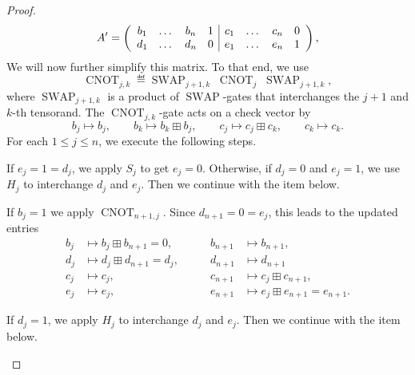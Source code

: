 \documentclass[a4paper, oneside, 12pt]{amsart}
\DeclareMathOperator{\SWAP}{SWAP}
\DeclareMathOperator{\CNOT}{CNOT}
\begin{document}
\begin{proof}
  \begin{equation*}
    A'=\left(
      \begin{array}{c c c c| c c c c}
        b_{1} & \dots & b_{n} & 1 & c_{1} & \dots & c_{n} & 0 \\
        d_{1} & \dots & d_{n} & 0 & e_{1} & \dots & e_{n} & 1
      \end{array}
    \right),
  \end{equation*}
  We will now further simplify this matrix.
  To that end, we use
  \begin{equation*}
    \CNOT_{j,k}\eqdef \SWAP_{j+1,k}\;\CNOT_{j}\;\SWAP_{j+1,k},
  \end{equation*}
  where \(\SWAP_{j+1,k}\) is a product of \(\SWAP\)-gates that interchanges the \(j+1\) and \(k\)-th tensorand.
  The \(\CNOT_{j,k}\)-gate acts on a check vector by
  \begin{equation*}
    b_{j} \mapsto b_{j}, \qquad b_{k}\mapsto b_{k}\boxplus b_{j}, \qquad
    c_{j} \mapsto c_{j} \boxplus c_{k}, \qquad c_{k}\mapsto c_{k}.
  \end{equation*}
  For each \(1 \leq j \leq n\), we execute the following steps.
  \begin{thmlist}
    \item If \(e_{j} =1 = d_{j}\), we  apply \(S_{j}\) to get \(e_{j}=0\).
    Otherwise, if \(d_{j}=0\) and \(e_{j}=1\), we use \(H_{j}\) to interchange \(d_{j}\) and \(e_{j}\).
    Then we continue with the item below.
    \item If \(b_{j}=1\) we apply \(\CNOT_{n+1,j}\). Since \(d_{n+1}= 0= e_{j}\), this leads to the updated entries
    \begin{align*}
      b_{j}&\mapsto b_{j}\boxplus b_{n+1} = 0, \qquad &  b_{n+1}&\mapsto b_{n+1},\\
      d_{j}&\mapsto d_{j}\boxplus d_{n+1} = d_{j}, \qquad &  d_{n+1}&\mapsto d_{n+1} \\
      c_{j}&\mapsto c_{j},\qquad &  c_{n+1}&\mapsto c_{j} \boxplus c_{n+1}, \\
      e_{j} &\mapsto e_{j},\qquad &  e_{n+1}&\mapsto e_{j} \boxplus e_{n+1} =e_{n+1}.
    \end{align*}
    \item If \(d_{j} = 1\), we apply \(H_{j}\) to interchange \(d_{j}\) and \(e_{j}\).
    Then we continue with the item below.


\end{thmlist}
\end{proof}
\end{document}
